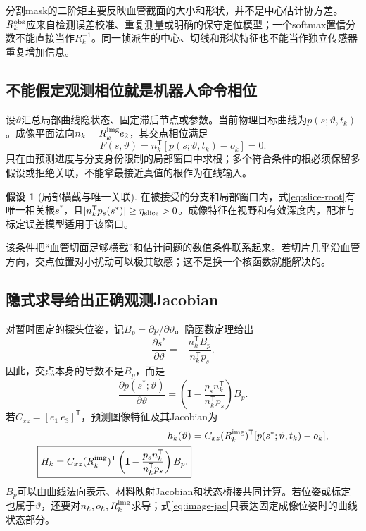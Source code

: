 \documentclass[UTF8,11pt,a4paper,fontset=fandol]{ctexart}
\numberwithin{equation}{section}
\theoremstyle{plain}
\theoremstyle{definition}
\newtheorem{assumption}[proposition]{假设}
\theoremstyle{remark}
\newcommand{\Id}{\mathbf I}\newcommand{\T}{^{\mathsf T}}
\begin{document}
分割mask的二阶矩主要反映血管截面的大小和形状，并不是中心估计协方差。$R_k^{\rm obs}$应来自检测误差校准、重复测量或明确的保守定位模型；一个softmax置信分数不能直接当作$R_k^{-1}$。同一帧派生的中心、切线和形状特征也不能当作独立传感器重复增加信息。

\subsection{不能假定观测相位就是机器人命令相位}
设$\vartheta$汇总局部曲线隐状态、固定滞后节点或参数。当前物理目标曲线为$p(s;\vartheta,t_k)$。成像平面法向$n_k=R_k^{\rm img}e_2$，其交点相位满足
\begin{equation}
 F(s,\vartheta)=n_k\T[p(s;\vartheta,t_k)-o_k]=0.
 \label{eq:slice-root}
\end{equation}
只在由预测进度与分支身份限制的局部窗口中求根；多个符合条件的根必须保留多假设或拒绝关联，不能拿最接近真值的根作为在线输入。

\begin{assumption}[局部横截与唯一关联]\label{ass:transverse}
在被接受的分支和局部窗口内，式\eqref{eq:slice-root}有唯一相关根$s^*$，且$|n_k\T p_s(s^*)|\geq\eta_{\rm slice}>0$。成像特征在视野和有效深度内，配准与标定误差模型适用于该窗口。
\end{assumption}

该条件把“血管切面足够横截”和估计问题的数值条件联系起来。若切片几乎沿血管方向，交点位置对小扰动可以极其敏感；这不是换一个核函数就能解决的。

\subsection{隐式求导给出正确观测Jacobian}
对暂时固定的探头位姿，记$B_p=\partial p/\partial\vartheta$。隐函数定理给出
\begin{equation}
 \frac{\partial s^*}{\partial\vartheta}
 =-\frac{n_k\T B_p}{n_k\T p_s}.
 \label{eq:root-jac}
\end{equation}
因此，交点本身的导数不是$B_p$，而是
\begin{equation}
 \boxed{
 \frac{\partial p(s^*;\vartheta)}{\partial\vartheta}
 =\left(\Id-\frac{p_s n_k\T}{n_k\T p_s}\right)B_p.
 }
 \label{eq:intersection-jac}
\end{equation}
若$C_{xz}=[e_1\ e_3]\T$，预测图像特征及其Jacobian为
\begin{align}
 h_k(\vartheta)&=C_{xz}(R_k^{\rm img})\T[p(s^*;\vartheta,t_k)-o_k],\\
 \boxed{H_k=C_{xz}(R_k^{\rm img})\T
 \left(\Id-\frac{p_sn_k\T}{n_k\T p_s}\right)B_p.}
 \label{eq:image-jac}
\end{align}
$B_p$可以由曲线法向表示、材料映射Jacobian和状态桥接共同计算。若位姿或标定也属于$\vartheta$，还要对$n_k,o_k,R_k^{\rm img}$求导；式\eqref{eq:image-jac}只表达固定成像位姿时的曲线状态部分。
\end{document}
